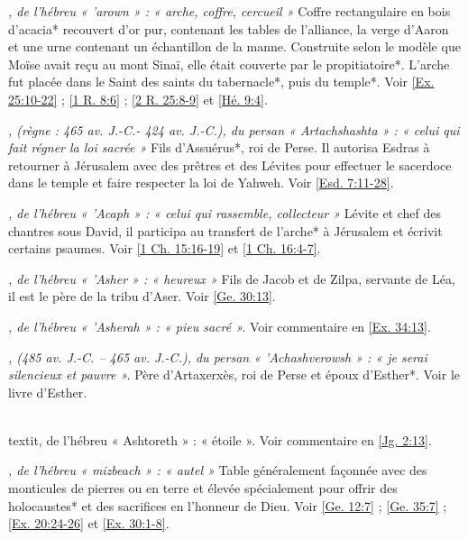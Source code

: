 \begin{multicols}{2}
\textit{, de l'hébreu « 'arown » : « arche, coffre, cercueil »}\newline
Coffre rectangulaire en bois d'acacia* recouvert d'or pur, contenant les tables de l'alliance, la verge d'Aaron et une urne contenant un échantillon de la manne. Construite selon le modèle que Moïse avait reçu au mont Sinaï, elle était couverte par le propitiatoire*. L'arche fut placée dans le Saint des saints du tabernacle*, puis du temple*. Voir \vref{Ex. 25:10-22} ; \vref{1 R. 8:6} ; \vref{2 R. 25:8-9} et \vref{Hé. 9:4}.

\textit{, (règne : 465 av. J.-C.- 424 av. J.-C.), du persan « Artachshashta » : « celui qui fait régner la loi sacrée »}\newline
Fils d'Assuérus*, roi de Perse. Il autorisa Esdras à retourner à Jérusalem avec des prêtres et des Lévites pour effectuer le sacerdoce dans le temple et faire respecter la loi de Yahweh. Voir \vref{Esd. 7:11-28}.

\textit{, de l'hébreu « 'Acaph » : « celui qui rassemble, collecteur »}\newline
Lévite et chef des chantres sous David, il participa au transfert de l'arche* à Jérusalem et écrivit certains psaumes. Voir \vref{1 Ch. 15:16-19} et \vref{1 Ch. 16:4-7}.

\textit{, de l'hébreu « 'Asher » : « heureux »}\newline
Fils de Jacob et de Zilpa, servante de Léa, il est le père de la tribu d'Aser. Voir \vref{Ge. 30:13}.

\textit{, de l'hébreu « 'Asherah » : « pieu sacré ».}\newline
Voir commentaire en \vref{Ex. 34:13}.

\textit{, (485 av. J.-C. – 465 av. J.-C.), du persan « 'Achashverowsh » : « je serai silencieux et pauvre ».}\newline
Père d'Artaxerxès, roi de Perse et époux d'Esther*. Voir le livre d'Esther.

\\textit{, de l'hébreu « Ashtoreth » : « étoile ».}\newline
Voir commentaire en \vref{Jg. 2:13}.

\textit{, de l'hébreu « mizbeach » : « autel »}\newline
Table généralement façonnée avec des monticules de pierres ou en terre et élevée spécialement pour offrir des holocaustes* et des sacrifices en l'honneur de Dieu. Voir \vref{Ge. 12:7} ; \vref{Ge. 35:7} ; \vref{Ex. 20:24-26} et \vref{Ex. 30:1-8}.


\end{multicols}
